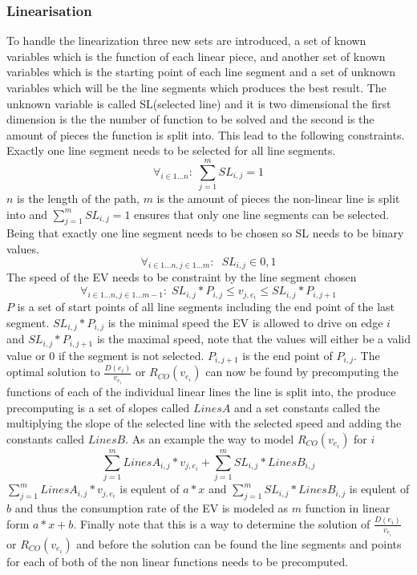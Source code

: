 \subsubsection{Linearisation}
To handle the linearization three new sets are introduced, a set of known variables which is the function of each linear piece, and another set of known variables which is the starting point of each line segment and a set of unknown variables which will be the line segments which produces the best result. The unknown variable is called SL(selected line) and it is two dimensional the first dimension is the the number of function to be solved and the second is the amount of pieces the function is split into. This lead to the following constraints.   
Exactly one line segment needs to be selected for all line segments. 
\begin{equation*}
\forall_{i\in1 \dots n }:\; \sum_{j=1}^{m} SL_{i,j} = 1
\end{equation*}
$n$ is the length of the path, $m$ is the amount of pieces the non-linear line is split into and $\sum_{j=1}^{m} SL_{i,j} = 1$ ensures that only one line segments can be selected. 
Being that exactly one line segment needs to be chosen so SL needs to be binary values. 
\begin{equation*}
\forall_{i\in1 \dots n, j \in 1 \dots m}: \; \; SL_{i,j} \in{0,1} 
\end{equation*}
The speed of the EV needs to be constraint by the line segment chosen
\begin{equation*}
\forall_{i\in1 \dots n, j \in 1 \dots m-1}:\; SL_{i,j} * P_{i,j}  \le  v_{j,e_i} \le SL_{i,j}*P_{i,j+1}
\end{equation*}
$P$ is a set of start points of all line segments including the end point of the last segment. $SL_{i,j} * P_{i,j}$ is the minimal speed the EV is allowed to drive on edge $i$ and $SL_{i,j}*P_{i,j+1}$ is the maximal speed, note that the values will either be a valid value or $0$ if the segment is not selected. $P_{i,j+1}$ is the end point of $P_{i,j}$. 
The optimal solution to $\frac{D(e_i)}{v_{e_i}}$ or $R_{CO}(v_{e_i})$ can now be found by precomputing the functions of each of the individual linear lines the line is split into, the produce precomputing is a set of slopes called $LinesA$ and a set constants called  the  multiplying the slope of the selected line with the selected speed and adding the constants called $LinesB$. As an example the way to model $R_{CO}(v_{e_i})$ for $i$
\begin{equation*}
\sum_{j=1}^{m} LinesA_{i,j}*v_{j,e_i} + \sum_{j=1}^{m} SL_{i,j}*LinesB_{i,j} 
\end{equation*}
$\sum_{j=1}^{m} LinesA_{i,j}*v_{j,e_i}$ is equlent of $a*x$ and $\sum_{j=1}^{m} SL_{i,j}*LinesB_{i,j}$ is equlent of $b$ and thus the consumption rate of the EV is modeled as $m$ function in linear form $a*x + b$. 
Finally note that this is a way to determine the solution of $\frac{D(e_i)}{v_{e_i}}$ or $R_{CO}(v_{e_i})$ and before the solution can be found the line segments and points for each of both of the non linear functions needs to be precomputed. 



